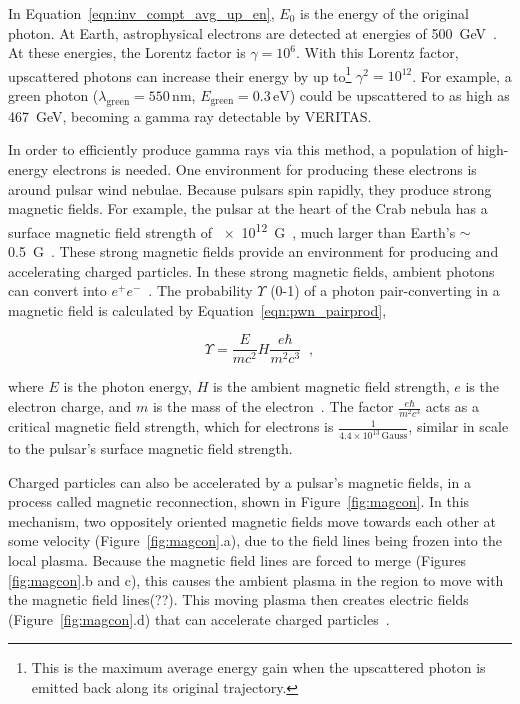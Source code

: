   
  In Equation~\ref{eqn:inv_compt_avg_up_en}, $E_{0}$ is the energy of the original photon.
  At Earth, astrophysical electrons are detected at energies of \SI{500}{GeV}~\cite{500GeVElectrons}.
  At these energies, the Lorentz factor is $\gamma = 10^6$.
  With this Lorentz factor, upscattered photons can increase their energy by up to\footnote{This is the maximum average energy gain when the upscattered photon is emitted back along its original trajectory.} $\gamma^{2} = 10^{12}$.
  For example, a green photon ($\lambda_{\textrm{green}}=550\,\textrm{nm}$, $E_{\textrm{green}}=0.3\,\textrm{eV}$) could be upscattered to as high as \SI{467}{GeV}, becoming a gamma ray detectable by VERITAS.
  
  In order to efficiently produce gamma rays via this method, a population of high-energy electrons is needed.
  One environment for producing these electrons is around pulsar wind nebulae.
  Because pulsars spin rapidly, they produce strong magnetic fields.
  For example, the pulsar at the heart of the Crab nebula has a surface magnetic field strength of \SI{e12}{G}~\cite{pwn_evolution}, much larger than Earth's $\sim$\SI{0.5}{G}~\cite{earth_geomag}.
  These strong magnetic fields provide an environment for producing and accelerating charged particles.
  In these strong magnetic fields, ambient photons can convert into $e^{+}e^{-}$~\cite{pwn_pairprod2,pwn_pairprod3}.
  The probability $\Upsilon$ (0-1) of a photon pair-converting in a magnetic field is calculated by Equation~\ref{eqn:pwn_pairprod},
  
  \begin{equation}\label{eqn:pwn_pairprod}
    \Upsilon = \frac{E}{mc^2} H \frac{e \hbar}{m^2c^3} \;\;,
  \end{equation}
  
  where $E$ is the photon energy, $H$ is the ambient magnetic field strength, $e$ is the electron charge, and $m$ is the mass of the electron~\cite{pwn_pairprod3}.
  The factor $\frac{e \hbar}{m^2c^3}$ acts as a critical magnetic field strength, which for electrons is $\frac{1}{4.4\times10^{13}\,\textrm{Gauss}}$, similar in scale to the pulsar's surface magnetic field strength.
  
  Charged particles can also be accelerated by a pulsar's magnetic fields, in a process called magnetic reconnection, shown in Figure~\ref{fig:magcon}.
  In this mechanism, two oppositely oriented magnetic fields move towards each other at some velocity (Figure~\ref{fig:magcon}.a), due to the field lines being frozen into the local plasma.
  Because the magnetic field lines are forced to merge (Figures \ref{fig:magcon}.b and c), this causes the ambient plasma in the region to move with the magnetic field lines{\color{red}(??)}.
  This moving plasma then creates electric fields (Figure~\ref{fig:magcon}.d) that can accelerate charged particles~\cite{magcon_crab,magcon_schopper,magcon_review}.
  
